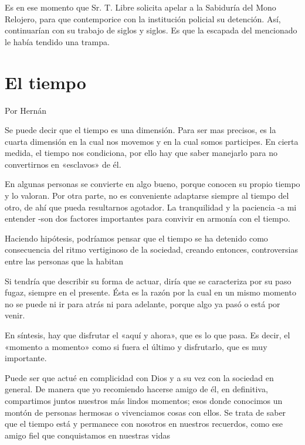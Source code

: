 \documentclass[11pt,twoside,openright,a5paper]{book}
\begin{document}
Es en ese momento que Sr. T. Libre solicita apelar a la Sabiduría del Mono Relojero, para que contemporice con la institución policial su detención. Así, continuarían con su trabajo de siglos y siglos. Es que la escapada del mencionado le había tendido una trampa.

\section*{El tiempo}

                                                                                                \begin{flushright}Por Hernán\end{flushright}

Se puede decir que el tiempo es una dimensión. Para ser mas precisos, es la cuarta dimensión  en la cual nos movemos y en la cual somos participes. En cierta medida, el tiempo nos condiciona, por ello hay que saber manejarlo para no convertirnos en «esclavos» de él.  

En algunas personas se convierte en algo bueno, porque conocen su propio tiempo y lo valoran. Por otra parte, no es conveniente adaptarse siempre  al tiempo del otro, de ahí que pueda resultarnos agotador. La tranquilidad y la paciencia -a mi entender -son dos factores importantes para convivir en armonía con el tiempo.

Haciendo hipótesis, podríamos pensar que el tiempo se ha detenido como consecuencia del ritmo vertiginoso de la sociedad, creando entonces, controversias entre las personas que la habitan

Si tendría que describir su forma de actuar, diría que se caracteriza por su paso fugaz, siempre  en el presente. Ésta es la razón por la cual en un mismo momento no se puede ni ir para atrás ni para adelante, porque algo ya pasó o está por venir. 

En síntesis, hay que disfrutar el «aquí y ahora», que es lo que pasa. Es decir, el «momento a momento» como si fuera el último y disfrutarlo, que es muy importante.

Puede ser que actué en complicidad con Dios y a su vez con la sociedad en general. De manera que yo recomiendo hacerse amigo de él, en definitiva, compartimos juntos nuestros más lindos momentos; esos donde conocimos un montón de personas hermosas o vivenciamos cosas con ellos. Se trata de saber que el tiempo está y permanece con nosotros en nuestros recuerdos, como ese amigo fiel que conquistamos en nuestras vidas
\end{document}
